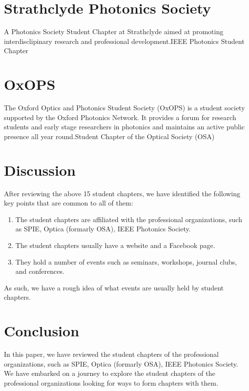 \documentclass[10pt, a4paper, twocolumn]{article}
\begin{document}
    \section{Strathclyde Photonics Society}
    A Photonics Society Student Chapter at Strathclyde aimed at promoting interdisclipinary research and professional development.IEEE Photonics Student Chapter

    \section{OxOPS}
    The Oxford Optics and Photonics Student Society (OxOPS) is a student society supported by the Oxford Photonics Network. It provides a forum for research students and early stage researchers in photonics and maintains an active public presence all year round.Student Chapter of the Optical Society (OSA)

    \section*{Discussion}
    After reviewing the above 15 student chapters, we have identified the following key points that are common to all of them:\\
    \begin{enumerate}
        \item The student chapters are affiliated with the professional organizations, such as SPIE, Optica (formarly OSA), IEEE Photonics Society.
        \item The student chapters usually have a website and a Facebook page.
        \item They hold a number of events such as seminars, workshops, journal clubs, and conferences.
    \end{enumerate}
    As such, we have a rough idea of what events are usually held by student chapters.

    \section*{Conclusion}
    In this paper, we have reviewed the student chapters of the professional organizations, such as SPIE, Optica (formarly OSA), IEEE Photonics Society.
    We have embarked on a journey to explore the student chapters of the professional organizations looking for ways to form chapters with them.

    \nocite{*}
    
    
\end{document}
